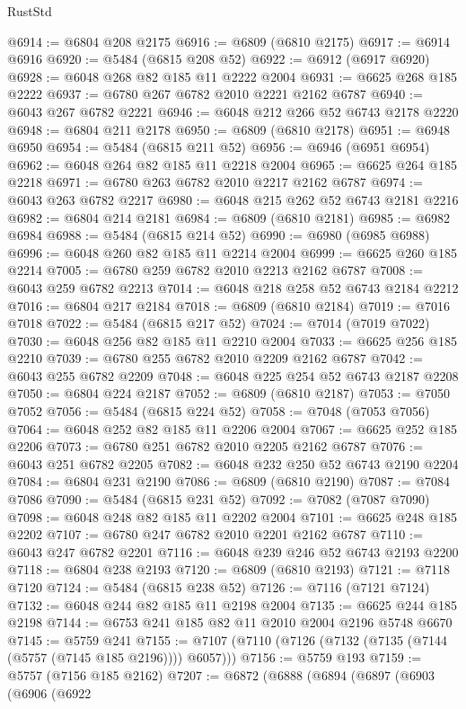 \begin{lexlean}{RustStd}
\begin{coremodule}
{\begin{coremodule}
{{{{{{{{{{{{{{{{{{{{{{{{{{{{{{{@6914 := @6804 @208 @2175
@6916 := @6809 (@6810 @2175)
@6917 := @6914 @6916
@6920 := @5484 (@6815 @208 @52)
@6922 := @6912 (@6917 @6920)
@6928 := @6048 @268 @82 @185 @11 @2222 @2004
@6931 := @6625 @268 @185 @2222
@6937 := @6780 @267 @6782 @2010 @2221 @2162 @6787
@6940 := @6043 @267 @6782 @2221
@6946 := @6048 @212 @266 @52 @6743 @2178 @2220
@6948 := @6804 @211 @2178
@6950 := @6809 (@6810 @2178)
@6951 := @6948 @6950
@6954 := @5484 (@6815 @211 @52)
@6956 := @6946 (@6951 @6954)
@6962 := @6048 @264 @82 @185 @11 @2218 @2004
@6965 := @6625 @264 @185 @2218
@6971 := @6780 @263 @6782 @2010 @2217 @2162 @6787
@6974 := @6043 @263 @6782 @2217
@6980 := @6048 @215 @262 @52 @6743 @2181 @2216
@6982 := @6804 @214 @2181
@6984 := @6809 (@6810 @2181)
@6985 := @6982 @6984
@6988 := @5484 (@6815 @214 @52)
@6990 := @6980 (@6985 @6988)
@6996 := @6048 @260 @82 @185 @11 @2214 @2004
@6999 := @6625 @260 @185 @2214
@7005 := @6780 @259 @6782 @2010 @2213 @2162 @6787
@7008 := @6043 @259 @6782 @2213
@7014 := @6048 @218 @258 @52 @6743 @2184 @2212
@7016 := @6804 @217 @2184
@7018 := @6809 (@6810 @2184)
@7019 := @7016 @7018
@7022 := @5484 (@6815 @217 @52)
@7024 := @7014 (@7019 @7022)
@7030 := @6048 @256 @82 @185 @11 @2210 @2004
@7033 := @6625 @256 @185 @2210
@7039 := @6780 @255 @6782 @2010 @2209 @2162 @6787
@7042 := @6043 @255 @6782 @2209
@7048 := @6048 @225 @254 @52 @6743 @2187 @2208
@7050 := @6804 @224 @2187
@7052 := @6809 (@6810 @2187)
@7053 := @7050 @7052
@7056 := @5484 (@6815 @224 @52)
@7058 := @7048 (@7053 @7056)
@7064 := @6048 @252 @82 @185 @11 @2206 @2004
@7067 := @6625 @252 @185 @2206
@7073 := @6780 @251 @6782 @2010 @2205 @2162 @6787
@7076 := @6043 @251 @6782 @2205
@7082 := @6048 @232 @250 @52 @6743 @2190 @2204
@7084 := @6804 @231 @2190
@7086 := @6809 (@6810 @2190)
@7087 := @7084 @7086
@7090 := @5484 (@6815 @231 @52)
@7092 := @7082 (@7087 @7090)
@7098 := @6048 @248 @82 @185 @11 @2202 @2004
@7101 := @6625 @248 @185 @2202
@7107 := @6780 @247 @6782 @2010 @2201 @2162 @6787
@7110 := @6043 @247 @6782 @2201
@7116 := @6048 @239 @246 @52 @6743 @2193 @2200
@7118 := @6804 @238 @2193
@7120 := @6809 (@6810 @2193)
@7121 := @7118 @7120
@7124 := @5484 (@6815 @238 @52)
@7126 := @7116 (@7121 @7124)
@7132 := @6048 @244 @82 @185 @11 @2198 @2004
@7135 := @6625 @244 @185 @2198
@7144 := @6753 @241 @185 @82 @11 @2010 @2004 @2196 @5748 @6670
@7145 := @5759 @241
@7155 := @7107 (@7110 (@7126 (@7132 (@7135 (@7144 (@5757 (@7145 @185 @2196)))) @6057)))
@7156 := @5759 @193
@7159 := @5757 (@7156 @185 @2162)
@7207 := @6872
    (@6888
      (@6894
        (@6897
          (@6903
            (@6906
              (@6922
}}}}}}}}}}}}}}}}}}}}}}}}}}}}}}}
\end{coremodule}}
\end{coremodule}
\end{lexlean}
